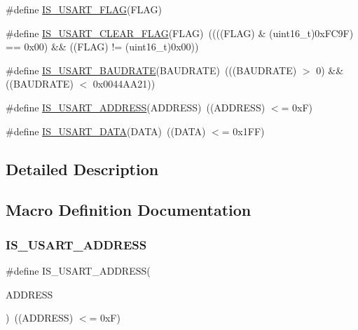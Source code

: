 \begin{DoxyCompactItemize}
\item 
\#define \mbox{\hyperlink{group___u_s_a_r_t___flags_ga3e20747ce7c97a36718933c0cb3dac29}{I\+S\+\_\+\+U\+S\+A\+R\+T\+\_\+\+F\+L\+AG}}(F\+L\+AG)
\item 
\#define \mbox{\hyperlink{group___u_s_a_r_t___flags_gadc905fdce8defba31c00c95554a26bc3}{I\+S\+\_\+\+U\+S\+A\+R\+T\+\_\+\+C\+L\+E\+A\+R\+\_\+\+F\+L\+AG}}(F\+L\+AG)~((((F\+L\+AG) \& (uint16\+\_\+t)0x\+F\+C9\+F) == 0x00) \&\& ((\+F\+L\+A\+G) != (uint16\+\_\+t)0x00))
\item 
\#define \mbox{\hyperlink{group___u_s_a_r_t___flags_ga9dc365e0a1e01031a8e0757a34b9d420}{I\+S\+\_\+\+U\+S\+A\+R\+T\+\_\+\+B\+A\+U\+D\+R\+A\+TE}}(B\+A\+U\+D\+R\+A\+TE)~(((B\+A\+U\+D\+R\+A\+TE) $>$ 0) \&\& ((B\+A\+U\+D\+R\+A\+TE) $<$ 0x0044\+A\+A21))
\item 
\#define \mbox{\hyperlink{group___u_s_a_r_t___flags_ga194e771c3324f9e130b2887c701460a7}{I\+S\+\_\+\+U\+S\+A\+R\+T\+\_\+\+A\+D\+D\+R\+E\+SS}}(A\+D\+D\+R\+E\+SS)~((A\+D\+D\+R\+E\+SS) $<$= 0x\+F)
\item 
\#define \mbox{\hyperlink{group___u_s_a_r_t___flags_gafd6307e41818e076d31f3c24cb5ba135}{I\+S\+\_\+\+U\+S\+A\+R\+T\+\_\+\+D\+A\+TA}}(D\+A\+TA)~((D\+A\+TA) $<$= 0x1\+F\+F)
\end{DoxyCompactItemize}


\subsection{Detailed Description}


\subsection{Macro Definition Documentation}
\mbox{\label{group___u_s_a_r_t___flags_ga194e771c3324f9e130b2887c701460a7}} 
\subsubsection{\texorpdfstring{IS\_USART\_ADDRESS}{IS\_USART\_ADDRESS}}
{\footnotesize\ttfamily \#define I\+S\+\_\+\+U\+S\+A\+R\+T\+\_\+\+A\+D\+D\+R\+E\+SS(\begin{DoxyParamCaption}\item[{}]{A\+D\+D\+R\+E\+SS }\end{DoxyParamCaption})~((A\+D\+D\+R\+E\+SS) $<$= 0x\+F)}

